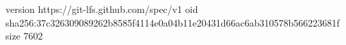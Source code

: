 version https://git-lfs.github.com/spec/v1
oid sha256:37c326309089262b8585f4114e0a04b11e20431d66ac6ab310578b566223681f
size 7602

